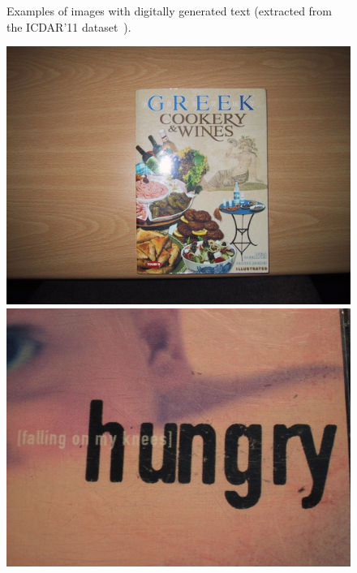 \begin{figure}[h!]
	
	
	\caption{Examples of images with digitally generated text (extracted from the ICDAR'11 dataset~\cite{Karatzas2011ICDAR}).}
	\label{fig:sample_icdar11}
    \end{figure}

    \begin{figure}[h!]
        \centering
    	\includegraphics[height=0.18\textheight]{related_work/figs/icdar13_img_8.jpg}
    	\includegraphics[height=0.18\textheight]{related_work/figs/icdar13_img_5.jpg}

\end{figure}
